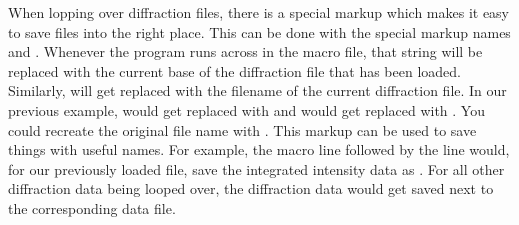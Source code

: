 When lopping over diffraction files, there is a special 
markup which makes it easy to save files into the right 
place. This can be done with the special markup names
 and . Whenever the
program runs across  in the macro file,
that string will be replaced with the current base of the 
diffraction file that has been loaded. Similarly, 
 will get replaced with the filename of
the current diffraction file. In our previous example,
 would get replaced with
 and  would get 
replaced with . You could recreate the 
original file name with .
This markup can be used to save things with useful names. For
example, the macro line 
followed by the line
 would, for
our previously loaded file, save the integrated intensity data
as . For
all other diffraction data being looped over, the diffraction data
would get saved next to the corresponding data file.
